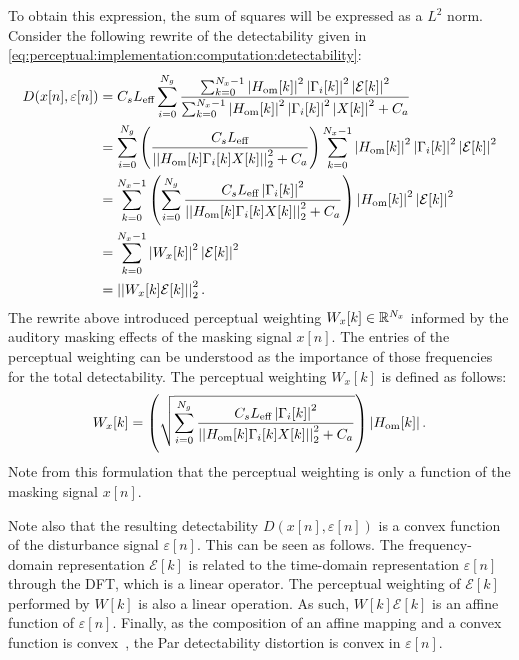 To obtain this expression, the sum of squares will be expressed as a $L^2$ norm.
Consider the following rewrite of the detectability given in 
\autoref{eq:perceptual:implementation:computation:detectability}: 
\begin{align*}
    D(x[n],\varepsilon[n]) &= C_s L_\text{eff}\sum_{i=0}^{N_g}
                        \frac{\sum_{k=0}^{N_x-1}\left|H_\text{om}[k]\right|^2\left|
                            \Gamma_i[k]\right|^2\left|\mathcal{E}[k]\right|^2}
                        {\sum_{k=0}^{N_x-1}\left|H_\text{om}[k]\right|^2\left|
                            \Gamma_i[k]\right|^2\left|X[k]\right|^2 + C_a} \\
                           &= \sum_{i=0}^{N_g}
                           \left(\frac{C_s L_\text{eff}}{\norm[2][2]{H_\text{om}[k]\Gamma_i[k]X[k]} + C_a}\right)
                        \sum_{k=0}^{N_x-1}\left|H_\text{om}[k]\right|^2\left|
                        \Gamma_i[k]\right|^2\left|\mathcal{E}[k]\right|^2 \\
                           &= \sum_{k=0}^{N_x-1}\left(\sum_{i=0}^{N_g}
                            \frac{C_s L_\text{eff}\left|\Gamma_i[k]\right|^2}
                                 {\norm[2][2]{H_\text{om}[k]\Gamma_i[k]X[k]} + C_a}\right)
                        \left|H_\text{om}[k]\right|^2\left|\mathcal{E}[k]\right|^2 \\
                           &= \sum_{k=0}^{N_x-1}\left|W_x[k]\right|^2\left|\mathcal{E}[k]\right|^2 \\
                           &= \norm[2][2]{W_x[k]\mathcal{E}[k]}. 
\end{align*}
The rewrite above introduced perceptual weighting $W_x[k]\in\mathbb{R}^{N_x}$ informed by the auditory masking effects of the masking signal $x[n]$. 
The entries of the perceptual weighting can be understood as the importance of those frequencies for the total detectability.
The perceptual weighting $W_x[k]$ is defined as follows: 
\begin{equation}
    W_x[k] = \left(\sqrt{\sum_{i=0}^{N_g}\frac{C_s L_\text{eff}\left|\Gamma_i[k]\right|^2}
        {\norm[2][2]{H_\text{om}[k]\Gamma_i[k]X[k]} + C_a}}\right)
        \left|H_\text{om}[k]\right|.
\end{equation}
Note from this formulation that the perceptual weighting is only a function of the masking signal $x[n]$.

Note also that the resulting detectability $D(x[n],\varepsilon[n])$ is a convex function 
of the disturbance signal $\varepsilon[n]$. 
This can be seen as follows.
The frequency-domain representation $\mathcal{E}[k]$ is related to the 
time-domain representation $\varepsilon[n]$ through the DFT, which is a linear operator.
The perceptual weighting of $\mathcal{E}[k]$ performed by $W[k]$ is also a linear operation.
As such, $W[k]\mathcal{E}[k]$ is an affine function of $\varepsilon[n]$.
Finally, as the composition of an affine mapping and a convex function is convex~\cite{boyd2004convex},
the Par detectability distortion
is convex in $\varepsilon[n]$.

